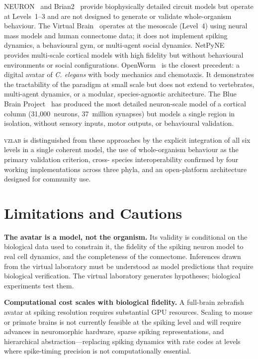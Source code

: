 \documentclass[12pt,a4paper]{article}
\begin{document}
NEURON~\cite{hines1997} and Brian2~\cite{stimberg2019} provide
biophysically detailed circuit models but operate at Levels~1--3 and
are not designed to generate or validate whole-organism behaviour.
The Virtual Brain~\cite{sanzleon2013} operates at the mesoscale
(Level~4) using neural mass models and human connectome data; it does
not implement spiking dynamics, a behavioural gym, or multi-agent
social dynamics.
NetPyNE~\cite{dura2019} provides multi-scale cortical models with
high fidelity but without behavioural environments or social
configurations.
OpenWorm~\cite{payne2018} is the closest precedent: a digital avatar
of \textit{C. elegans} with body mechanics and chemotaxis.
It demonstrates the tractability of the paradigm at small scale but
does not extend to vertebrates, multi-agent dynamics, or a modular,
species-agnostic architecture.
The Blue Brain Project~\cite{markram2015} has produced the most
detailed neuron-scale model of a cortical column (31,000~neurons,
37~million synapses) but models a single region in isolation, without
sensory inputs, motor outputs, or behavioural validation.

\textsc{vzlab} is distinguished from these approaches by the explicit
integration of all six levels in a single coherent model, the use of
whole-organism behaviour as the primary validation criterion, cross-
species interoperability confirmed by four working implementations
across three phyla, and an open-platform architecture designed for
community use.


\section*{Limitations and Cautions}

\textbf{The avatar is a model, not the organism.}
Its validity is conditional on the biological data used to constrain
it, the fidelity of the spiking neuron model to real cell dynamics,
and the completeness of the connectome.
Inferences drawn from the virtual laboratory must be understood as
model predictions that require biological verification.
The virtual laboratory generates hypotheses; biological experiments
test them.

\textbf{Computational cost scales with biological fidelity.}
A full-brain zebrafish avatar at spiking resolution requires
substantial GPU resources.
Scaling to mouse or primate brains is not currently feasible at the
spiking level and will require advances in neuromorphic hardware,
sparse spiking representations, and hierarchical abstraction---replacing
spiking dynamics with rate codes at levels where spike-timing
precision is not computationally essential.
\end{document}
